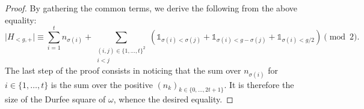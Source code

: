 \documentclass[11pt,letterpaper]{amsart}
\numberwithin{equation}{section}
\numberwithin{df}{section}
\begin{document}
\begin{proof}
%

By gathering the common terms, we derive the following from the above equality:
\begin{equation}
\lvert H_{<g,+}\rvert\equiv\sum_{i=1}^t n_{\sigma(i)}+\sum_{\substack{(i,j)\in \lbrace 1,\dots ,t\rbrace^2\\i<j}}\left(\mathds{1}_{\sigma(i)<\sigma(j)}+\mathds{1}_{\sigma(i)<g-\sigma(j)}+\mathds{1}_{\sigma(i)<g/2}\right)\pmod{2}.\label{eq:hpluspair}
\end{equation}
The last step of the proof consists in noticing that the sum over $n_{\sigma(i)}$ for $i\in\lbrace 1,\dots,t\rbrace$ is the sum over the positive $(n_k)_{k\in\lbrace 0,\dots,2t+1\rbrace}$. It is therefore the size of the Durfee square of $\omega$, whence the desired equality.
\end{proof}
\end{document}
